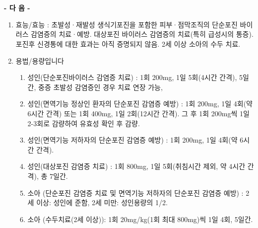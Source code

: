 \section{}
{
\par
\begin{center}\textbf{- 다          음 -}\end{center}
\begin{enumerate}[가.]\tightlist
\item 효능/효능 : 초발성·재발성 생식기포진을 포함한 피부·점막조직의 단순포진 바이러스 감염증의 치료·예방.\newline 
대상포진 바이러스 감염증의 치료(특히 급성시의 통증). 포진후 신경통에 대한 효과는 아직 증명되지 않음. \newline
2세 이상 소아의 수두 치료.

\item 용법/용량입니다
	\begin{enumerate}[1)]\tightlist
	\item 성인(단순포진바이러스 감염증 치료) : 1회 200mg, 1일 5회(4시간 간격), 5일간, 중증 초발성 감염증인 경우 치료 연장 가능, 
	\item 성인(면역기능 정상인 환자의 단순포진 감염증 예방) : 1회 200mg, 1일 4회(약 6시간 간격) 또는 1회 400mg, 1일 2회(12시간 간격). 그 후 1회 200mg씩 1일 2-3회로 감량하여 유효성 확인 후 감량. 
	\item 성인(면역기능 저하자의 단순포진 감염증 예방) : 1회 200mg, 1일 4회(약 6시간 간격). 
	\item 성인(대상포진 감염증 치료) : 1회 800mg, 1일 5회(취침시간 제외, 약 4시간 간격), 총 7일간. 
	\item 소아 (단순포진 감염증 치료 및 면역기능 저하자의 단순포진 감염증 예방) : 2세 이상: 성인에 준함, 2세 미만: 성인용량의 1/2. 
	\item 소아 (수두치료(2세 이상)): 1회 20mg/kg(1회 최대 800mg)씩 1일 4회, 5일간. 
	\end{enumerate}
\end{enumerate}
}
